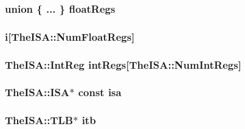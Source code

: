 \label{classSimpleThread_a1ad2ddcae8ed0b6b5f1807294a6093e7}
\hypertarget{classSimpleThread_a3dfbf30c655c5ae58763d7b1b5321501}{
\subsubsection[{floatRegs}]{\setlength{\rightskip}{0pt plus 5cm}union \{ ... \}   {\bf floatRegs}}}
\label{classSimpleThread_a3dfbf30c655c5ae58763d7b1b5321501}
\hypertarget{classSimpleThread_a2dbb1d94eafced2e977e763f9254a549}{
\subsubsection[{i}]{ {\bf i}\mbox{[}TheISA::NumFloatRegs\mbox{]}}}
\label{classSimpleThread_a2dbb1d94eafced2e977e763f9254a549}
\hypertarget{classSimpleThread_a60193e9fd43c9cb3bec8505a0b25e3b1}{
\subsubsection[{intRegs}]{\setlength{\rightskip}{0pt plus 5cm}TheISA::IntReg {\bf intRegs}\mbox{[}TheISA::NumIntRegs\mbox{]}}}
\label{classSimpleThread_a60193e9fd43c9cb3bec8505a0b25e3b1}
\hypertarget{classSimpleThread_a8634f828e98f5175e8838b3c99532ba5}{
\subsubsection[{isa}]{\setlength{\rightskip}{0pt plus 5cm}TheISA::ISA$\ast$ const {\bf isa}}}
\label{classSimpleThread_a8634f828e98f5175e8838b3c99532ba5}
\hypertarget{classSimpleThread_abcb37ddc11515555d8484702697bc4bb}{
\subsubsection[{itb}]{\setlength{\rightskip}{0pt plus 5cm}TheISA::TLB$\ast$ {\bf itb}}}
